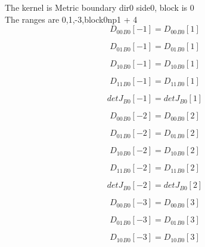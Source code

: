 \documentclass{article}
\begin{document}
\noindent The kernel is Metric boundary dir0 side0, block is 0\\\noindent The ranges are 0,1,-3,block0np1 + 4\\\begin{dmath}{D_{00}{_{B0}}}[{-1}] = {D_{00}{_{B0}}}[{1}]\end{dmath}

\begin{dmath}{D_{01}{_{B0}}}[{-1}] = {D_{01}{_{B0}}}[{1}]\end{dmath}

\begin{dmath}{D_{10}{_{B0}}}[{-1}] = {D_{10}{_{B0}}}[{1}]\end{dmath}

\begin{dmath}{D_{11}{_{B0}}}[{-1}] = {D_{11}{_{B0}}}[{1}]\end{dmath}

\begin{dmath}{detJ{_{B0}}}[{-1}] = {detJ{_{B0}}}[{1}]\end{dmath}

\begin{dmath}{D_{00}{_{B0}}}[{-2}] = {D_{00}{_{B0}}}[{2}]\end{dmath}

\begin{dmath}{D_{01}{_{B0}}}[{-2}] = {D_{01}{_{B0}}}[{2}]\end{dmath}

\begin{dmath}{D_{10}{_{B0}}}[{-2}] = {D_{10}{_{B0}}}[{2}]\end{dmath}

\begin{dmath}{D_{11}{_{B0}}}[{-2}] = {D_{11}{_{B0}}}[{2}]\end{dmath}

\begin{dmath}{detJ{_{B0}}}[{-2}] = {detJ{_{B0}}}[{2}]\end{dmath}

\begin{dmath}{D_{00}{_{B0}}}[{-3}] = {D_{00}{_{B0}}}[{3}]\end{dmath}

\begin{dmath}{D_{01}{_{B0}}}[{-3}] = {D_{01}{_{B0}}}[{3}]\end{dmath}

\begin{dmath}{D_{10}{_{B0}}}[{-3}] = {D_{10}{_{B0}}}[{3}]\end{dmath}
\end{document}
